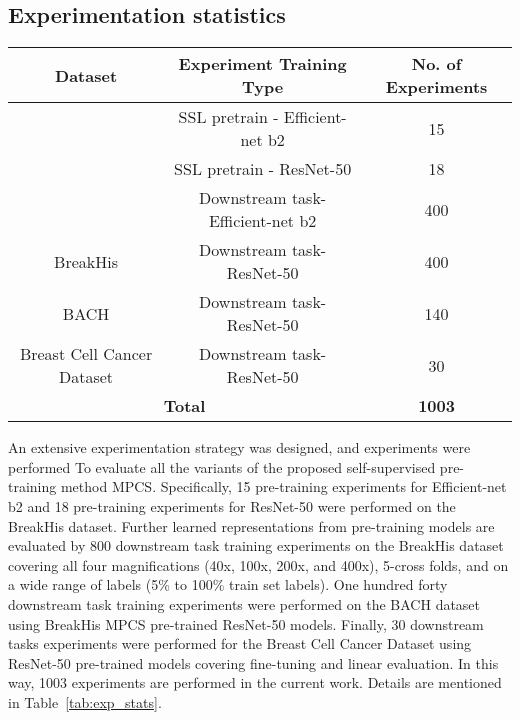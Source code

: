 \documentclass[conference]{IEEEtran}
\begin{document}
\subsection{Experimentation statistics}
\begin{table*}[t]
\centering
\caption{Experimentation statistics for proposed method MPCS}
\label{tab:exp_stats}
\begin{tabular}{cc|c}
\hline
\multicolumn{1}{c|}{Dataset}                    & Experiment Training Type          & No. of Experiments         \\ \hline
\multicolumn{1}{c|}{}                           & SSL pretrain - Efficient-net b2   & 15                         \\
\multicolumn{1}{c|}{}                           & SSL pretrain - ResNet-50          & 18                         \\
\multicolumn{1}{c|}{}                           & Downstream task- Efficient-net b2 & 400                        \\
\multicolumn{1}{c|}{\multirow{-4}{*}{BreakHis}} & Downstream task- ResNet-50        & {\color[HTML]{1E1E1E} 400} \\ \hline
\multicolumn{1}{c|}{BACH}                       & Downstream task- ResNet-50        & 140                        \\ \hline
\multicolumn{1}{c|}{Breast Cell Cancer Dataset} & Downstream task- ResNet-50        & 30                         \\ \hline
\multicolumn{2}{c|}{\textbf{Total}}                                                 & \textbf{1003}              \\ \hline
\end{tabular} 
\end{table*} An extensive experimentation strategy was designed, and experiments were performed To evaluate all the variants of the proposed self-supervised pre-training method MPCS. Specifically, 15 pre-training experiments for Efficient-net b2 and 18 pre-training experiments for ResNet-50 were performed on the BreakHis dataset. Further learned representations from pre-training models are evaluated by 800 downstream task training experiments on the BreakHis dataset covering all four magnifications (40x, 100x, 200x, and 400x), 5-cross folds, and on a wide range of labels (5\% to 100\% train set labels). One hundred forty downstream task training experiments were performed on the BACH dataset using BreakHis MPCS pre-trained ResNet-50 models. Finally, 30 downstream tasks experiments were performed for the Breast Cell Cancer Dataset using ResNet-50 pre-trained models covering fine-tuning and linear evaluation. In this way, 1003 experiments are performed in the current work. Details are mentioned in Table~\ref{tab:exp_stats}.
%
 
\end{document}
